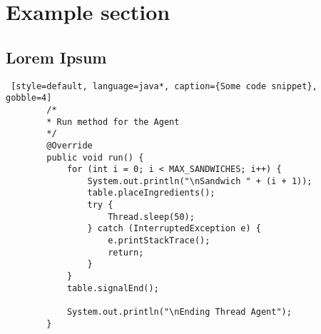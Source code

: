 \section{Example section}
\subsection{Lorem Ipsum}
\lipsum[2-3]

\begin{minipage}{\textwidth}
    \begin{lstlisting} [style=default, language=java*, caption={Some code snippet}, gobble=4]
        /*
        * Run method for the Agent
        */
        @Override
        public void run() {
            for (int i = 0; i < MAX_SANDWICHES; i++) {
                System.out.println("\nSandwich " + (i + 1));
                table.placeIngredients();
                try {
                    Thread.sleep(50);
                } catch (InterruptedException e) {
                    e.printStackTrace();
                    return;
                }
            }
            table.signalEnd();

            System.out.println("\nEnding Thread Agent");
        }
        
    \end{lstlisting}
\end{minipage}


%     
